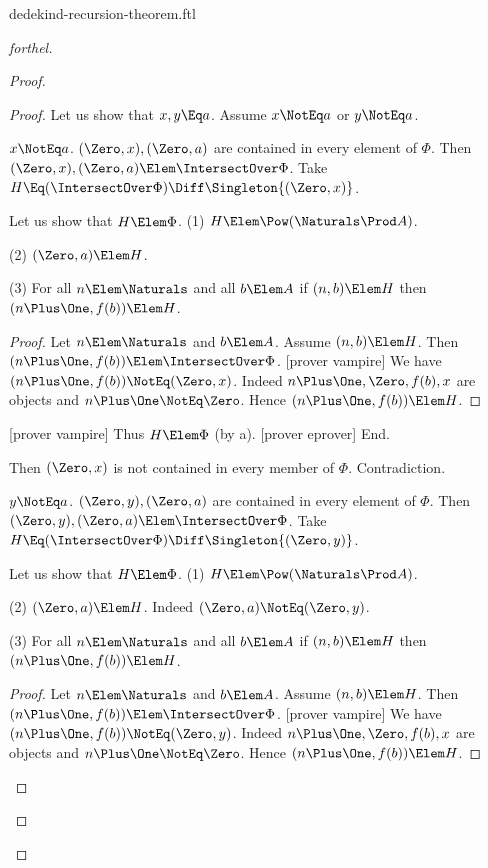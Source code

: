 \documentclass{stex}
\begin{document}
\begin{smodule}{dedekind-recursion-theorem.ftl}
\begin{proof}[forthel]
\begin{proof}
\begin{proof}
        Let us show that $x, y \Eq a$.
          Assume $x \NotEq a$ or $y \NotEq a$.

          \begin{case}{$x \NotEq a$.}
            $(\Zero,x), (\Zero,a)$ are contained in every element of $\Phi$.
            Then $(\Zero,x), (\Zero,a) \Elem \IntersectOver \Phi$.
            Take $H \Eq (\IntersectOver \Phi) \Diff \Singleton{(\Zero,x)}$.

            Let us show that $H \Elem \Phi$.
              (1) $H \Elem \Pow(\Naturals \Prod A)$.

              (2) $(\Zero,a) \Elem H$.

              (3) For all $n \Elem \Naturals$ and all $b \Elem A$ if
              $(n,b) \Elem H$ then $(n \Plus \One, f(b)) \Elem H$.
              \begin{proof}
                Let $n \Elem \Naturals$ and $b \Elem A$.
                Assume $(n,b) \Elem H$.
                Then $(n \Plus \One, f(b)) \Elem \IntersectOver \Phi$.
                [prover vampire]
                We have $(n \Plus \One, f(b)) \NotEq (\Zero,x)$.
                Indeed $n \Plus \One, \Zero, f(b), x$ are objects and $n \Plus \One \NotEq \Zero$.
                Hence $(n \Plus \One, f(b)) \Elem H$.
              \end{proof}

              [prover vampire]
              Thus $H \Elem \Phi$ (by a).
              [prover eprover]
            End.

            Then $(\Zero,x)$ is not contained in every member of $\Phi$.
            Contradiction.
          \end{case}

          \begin{case}{$y \NotEq a$.}
            $(\Zero,y), (\Zero,a)$ are contained in every element of $\Phi$.
            Then $(\Zero,y), (\Zero,a) \Elem \IntersectOver \Phi$.
            Take $H \Eq (\IntersectOver \Phi) \Diff \Singleton{(\Zero,y)}$.

            Let us show that $H \Elem \Phi$.
              (1) $H \Elem \Pow(\Naturals \Prod A)$.

              (2) $(\Zero,a) \Elem H$.
              Indeed $(\Zero,a) \NotEq (\Zero,y)$.

              (3) For all $n \Elem \Naturals$ and all $b \Elem A$ if
              $(n,b) \Elem H$ then $(n \Plus \One, f(b)) \Elem H$.
              \begin{proof}
                Let $n \Elem \Naturals$ and $b \Elem A$.
                Assume $(n,b) \Elem H$.
                Then $(n \Plus \One, f(b)) \Elem \IntersectOver \Phi$.
                [prover vampire]
                We have $(n \Plus \One, f(b)) \NotEq (\Zero,y)$.
                Indeed $n \Plus \One, \Zero, f(b), x$ are objects and $n \Plus \One \NotEq \Zero$.
                Hence $(n \Plus \One, f(b)) \Elem H$.
              \end{proof}


\end{case}
\end{proof}
\end{proof}
\end{proof}
\end{smodule}
\end{document}
